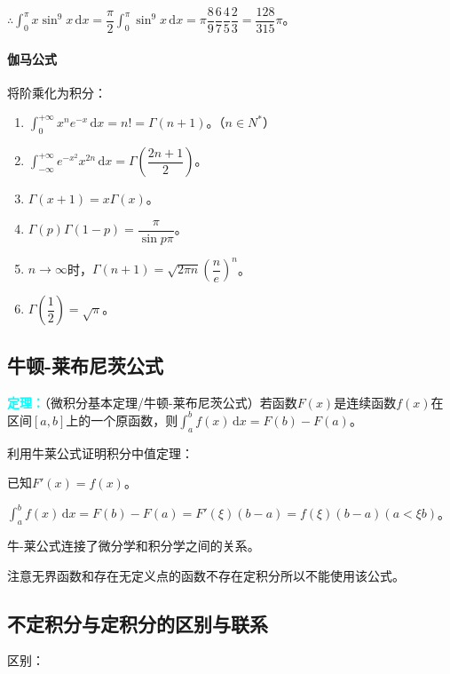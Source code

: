 \documentclass[UTF8, 12pt]{ctexart}
\begin{document}
        $\therefore\int_0^\pi x\sin^9x\,\textrm{d}x=\dfrac{\pi}{2}\int_0^\pi\sin^9x\,\textrm{d}x=\pi\dfrac{8}{9}\dfrac{6}{7}\dfrac{4}{5}\dfrac{2}{3}=\dfrac{128}{315}\pi$。

        \paragraph{伽马公式} \leavevmode \medskip

        将阶乘化为积分：

        \begin{enumerate}
            \item $\int_0^{+\infty}x^ne^{-x}\,\textrm{d}x=n!=\Gamma(n+1)$。（$n\in N^*$）
            \item $\int_{-\infty}^{+\infty}e^{-x^2}x^{2n}\,\textrm{d}x=\Gamma\left(\dfrac{2n+1}{2}\right)$。
            \item $\Gamma(x+1)=x\Gamma(x)$。
            \item $\Gamma(p)\Gamma(1-p)=\dfrac{\pi}{\sin p\pi}$。
            \item $n\to\infty$时，$\Gamma(n+1)=\sqrt{2\pi n}\left(\dfrac{n}{e}\right)^n$。
            \item $\Gamma\left(\dfrac{1}{2}\right)=\sqrt{\pi}$。
        \end{enumerate}

        \subsection{牛顿-莱布尼茨公式}

        \textcolor{aqua}{\textbf{定理：}}（微积分基本定理/牛顿-莱布尼茨公式）若函数$F(x)$是连续函数$f(x)$在区间$[a,b]$上的一个原函数，则$\int_a^bf(x)\,\textrm{d}x=F(b)-F(a)$。

        利用牛莱公式证明积分中值定理：

        已知$F'(x)=f(x)$。

        $\int_a^bf(x)\,\textrm{d}x=F(b)-F(a)=F'(\xi)(b-a)=f(\xi)(b-a)(a<\xi b)$。

        牛-莱公式连接了微分学和积分学之间的关系。

        注意无界函数和存在无定义点的函数不存在定积分所以不能使用该公式。

        \subsection{不定积分与定积分的区别与联系}

        区别：
\end{document}
